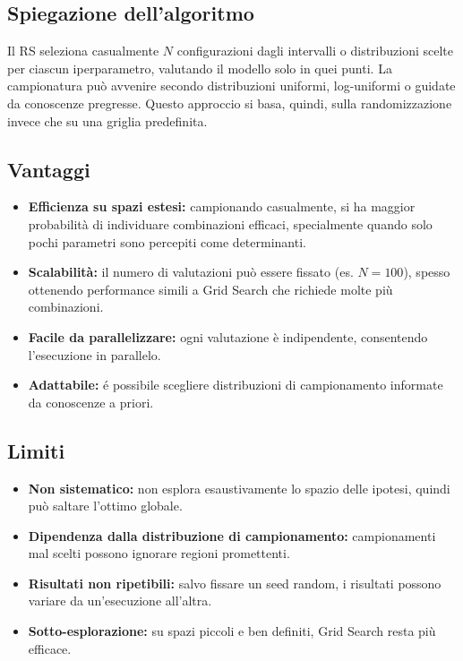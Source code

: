 \documentclass[a4paper,12pt]{report}
\begin{document}
	\subsection{Spiegazione dell'algoritmo}
	Il RS seleziona casualmente $N$ configurazioni dagli intervalli o distribuzioni scelte per ciascun iperparametro, valutando il modello solo in quei punti. La campionatura può avvenire secondo distribuzioni uniformi, log-uniformi o guidate da conoscenze pregresse. Questo approccio si basa, quindi, sulla randomizzazione invece che su una griglia predefinita.
	
	\subsection{Vantaggi}
	\begin{itemize}
		\item \textbf{Efficienza su spazi estesi:} campionando casualmente, si ha maggior probabilità di individuare combinazioni efficaci, specialmente quando solo pochi parametri sono percepiti come determinanti.
		\item \textbf{Scalabilità:} il numero di valutazioni può essere fissato (es. $N=100$), spesso ottenendo performance simili a Grid Search che richiede molte più combinazioni.
		\item \textbf{Facile da parallelizzare:} ogni valutazione è indipendente, consentendo l’esecuzione in parallelo.
		\item \textbf{Adattabile:} é possibile scegliere distribuzioni di campionamento informate da conoscenze a priori.
	\end{itemize}
	
	\subsection{Limiti}
	\begin{itemize}
		\item \textbf{Non sistematico:} non esplora esaustivamente lo spazio delle ipotesi, quindi può saltare l’ottimo globale.
		\item \textbf{Dipendenza dalla distribuzione di campionamento:} campionamenti mal scelti possono ignorare regioni promettenti.
		\item \textbf{Risultati non ripetibili:} salvo fissare un seed random, i risultati possono variare da un'esecuzione all'altra.
		\item \textbf{Sotto-esplorazione:} su spazi piccoli e ben definiti, Grid Search resta più efficace.
	\end{itemize}
	
\end{document}
